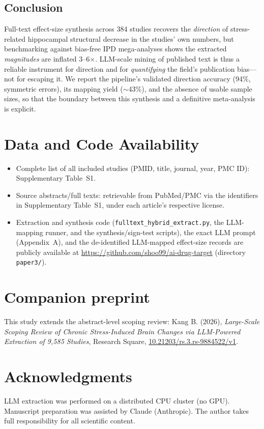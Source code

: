 \documentclass[11pt]{article}
\begin{document}
\subsection{Conclusion}
Full-text effect-size synthesis across 384 studies recovers the \emph{direction}
of stress-related hippocampal structural decrease in the studies' own numbers,
but benchmarking against bias-free IPD mega-analyses shows the extracted
\emph{magnitudes} are inflated 3--6$\times$. LLM-scale mining of published text is
thus a reliable instrument for direction and for \emph{quantifying} the field's
publication bias---not for escaping it. We report the pipeline's validated
direction accuracy (94\%, symmetric errors), its mapping yield ($\sim$43\%), and
the absence of usable sample sizes, so that the boundary between this synthesis
and a definitive meta-analysis is explicit.

\section*{Data and Code Availability}
\begin{itemize}
\item Complete list of all included studies (PMID, title, journal, year, PMC
ID): Supplementary Table~S1.
\item Source abstracts/full texts: retrievable from PubMed/PMC via the
identifiers in Supplementary Table~S1, under each article's respective license.
\item Extraction and synthesis code (\texttt{fulltext\_hybrid\_extract.py}, the
LLM-mapping runner, and the synthesis/sign-test scripts), the exact LLM prompt
(Appendix~A), and the de-identified LLM-mapped effect-size records are publicly
available at \url{https://github.com/shoo99/ai-drug-target} (directory
\texttt{paper3/}).
\end{itemize}

\section*{Companion preprint}
This study extends the abstract-level scoping review:
Kang B. (2026), \emph{Large-Scale Scoping Review of Chronic Stress-Induced Brain
Changes via LLM-Powered Extraction of 9,585 Studies}, Research Square,
\href{https://doi.org/10.21203/rs.3.rs-9884522/v1}{10.21203/rs.3.rs-9884522/v1}.

\section*{Acknowledgments}
LLM extraction was performed on a distributed CPU cluster (no GPU). Manuscript
preparation was assisted by Claude (Anthropic). The author takes full
responsibility for all scientific content.
\end{document}
